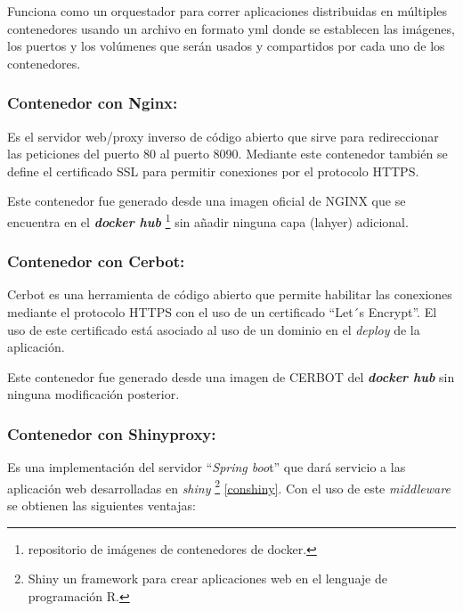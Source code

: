 \documentclass[
  10,
  openany]{book}
\begin{document}
Funciona como un orquestador para correr aplicaciones distribuidas en múltiples contenedores usando un archivo en formato yml donde se establecen las imágenes, los puertos y los volúmenes que serán usados y compartidos por cada uno de los contenedores.

\hypertarget{contenedor-con-nginx}{%
\subsubsection{Contenedor con Nginx:}\label{contenedor-con-nginx}}

Es el servidor web/proxy inverso de código abierto que sirve para redireccionar las peticiones del puerto 80 al puerto 8090. Mediante este contenedor también se define el certificado SSL para permitir conexiones por el protocolo HTTPS.

Este contenedor fue generado desde una imagen oficial de NGINX que se encuentra en el \textbf{\emph{docker hub}} \footnote{repositorio de imágenes de contenedores de docker.} sin añadir ninguna capa (lahyer) adicional.

\hypertarget{contenedor-con-cerbot}{%
\subsubsection{Contenedor con Cerbot:}\label{contenedor-con-cerbot}}

Cerbot es una herramienta de código abierto que permite habilitar las conexiones mediante el protocolo HTTPS con el uso de un certificado ``Let´s Encrypt''. El uso de este certificado está asociado al uso de un dominio en el \emph{deploy} de la aplicación.

Este contenedor fue generado desde una imagen de CERBOT del \textbf{\emph{docker hub}} sin ninguna modificación posterior.

\hypertarget{conshinyproxy}{%
\subsubsection{Contenedor con Shinyproxy:}\label{conshinyproxy}}

Es una implementación del servidor ``\emph{Spring boo}t'' que dará servicio a las aplicación web desarrolladas en \emph{shiny} \footnote{Shiny un framework para crear aplicaciones web en el lenguaje de programación R.} \ref{conshiny}. Con el uso de este \emph{middleware} se obtienen las siguientes ventajas:
\end{document}
